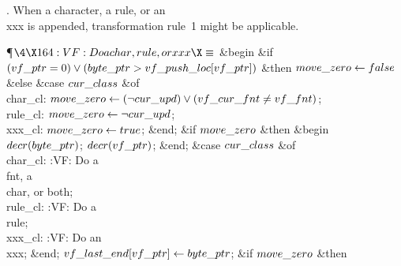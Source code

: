 . When a character, a rule, or an \\{xxx} is appended, transformation
rule~1 might be applicable.

\Y\P$\4\X164:VF: Do a \\{char}, \\{rule}, or \\{xxx}\X\S$\6
\&{begin} \&{if} $(\\{vf\_ptr}=0)\V(\\{byte\_ptr}>\\{vf\_push\_loc}[\\{vf%
\_ptr}])$ \1\&{then}\5
$\\{move\_zero}\gets\\{false}$\6
\4\&{else} \&{case} $\\{cur\_class}$ \1\&{of}\6
\4\\{char\_cl}: $\\{move\_zero}\K(\R\\{cur\_upd})\V(\\{vf\_cur\_fnt}\I\\{vf%
\_fnt})$;\6
\4\\{rule\_cl}: $\\{move\_zero}\gets\lnot\\{cur\_upd}$;\6
\4\\{xxx\_cl}: $\\{move\_zero}\gets\\{true}$;\2\6
\&{end};\2\6
\&{if} $\\{move\_zero}$ \1\&{then}\6
\&{begin} $\\{decr}(\\{byte\_ptr})$;\5
$\\{decr}(\\{vf\_ptr})$;\6
\&{end};\2\6
\&{case} $\\{cur\_class}$ \1\&{of}\6
\4\\{char\_cl}: :VF: Do a \\{fnt}, a \\{char}, or both\X;\6
\4\\{rule\_cl}: :VF: Do a \\{rule}\X;\6
\4\\{xxx\_cl}: :VF: Do an \\{xxx}\X;\2\6
\&{end};\6
$\\{vf\_last\_end}[\\{vf\_ptr}]\gets\\{byte\_ptr}$;\6
\&{if} $\\{move\_zero}$ \1\&{then}\6
